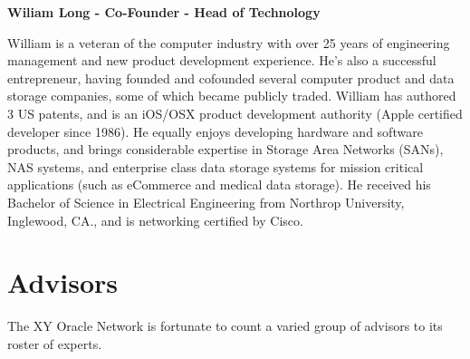 \documentclass{article}
\begin{document}
\begin {framed}
\begin {center}
\textbf{Wiliam Long - Co-Founder - Head of Technology}\par
\end {center}
William is a veteran of the computer industry with over 25 years of engineering management and new product development experience.  He's also a successful entrepreneur, having founded and cofounded several computer product and data storage companies, some of which became publicly traded.  William has authored 3 US patents, and is an iOS/OSX product development authority (Apple certified developer since 1986).  He equally enjoys developing hardware and software products, and brings considerable expertise in Storage Area Networks (SANs), NAS systems, and enterprise class data storage systems for mission critical applications (such as eCommerce and medical data storage).  He received his Bachelor of Science in Electrical Engineering from Northrop University, Inglewood, CA., and is networking certified by Cisco.
\end {framed}

\section {Advisors}
The XY Oracle Network is fortunate to count a varied group of advisors to its roster of experts.

\begin{comment}
\begin {framed}
\begin {center}
\textbf{Kelsey Cole (tentative)}\par
\end {center}
Co-Founder and Chief Brand Officer at Adbank
\end {framed}

\begin {framed}
\begin {center}
\textbf{Daniel Aranda (tentative)}\par
\end {center}
Managing Director, Europe at Ripple
\end {framed}
\end{comment}

\clearpage
 
\printglossaries
\end{document}
